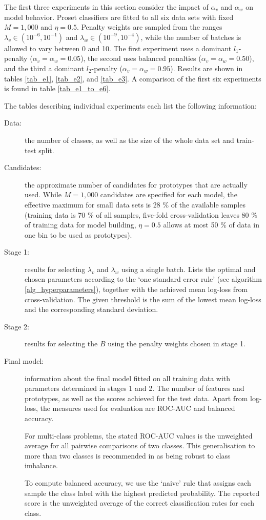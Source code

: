 %
The first three experiments in this section consider the impact of $\alpha_v$ and $\alpha_w$ on model behavior.
Proset classifiers are fitted to all six data sets with fixed $M=1,000$ and $\eta=0.5$.
Penalty weights are sampled from the ranges $\lambda_v\in(10^{-6},10^{-1})$ and $\lambda_w\in(10^{-9},10^{-4})$, while the number of batches is allowed to vary between 0 and 10.
The first experiment uses a dominant $l_1$-penalty ($\alpha_v=\alpha_w=0.05$), the second uses balanced penalties ($\alpha_v=\alpha_w=0.50$), and the third a dominant $l_2$-penalty ($\alpha_v=\alpha_w=0.95$).
Results are shown in tables \ref{tab_e1}, \ref{tab_e2}, and \ref{tab_e3}.
A comparison of the first six experiments is found in table \ref{tab_e1_to_e6}.\par
%
The tables describing individual experiments each list the following information:
%
\begin{description}
\item[Data:] the number of classes, as well as the size of the whole data set and train-test split.
%
\item[Candidates:] the approximate number of candidates for prototypes that are actually used.
While $M=1,000$ candidates are specified for each model, the effective maximum for small data sets is 28 \% of the available samples (training data is 70 \% of all samples, five-fold cross-validation leaves 80 \% of training data for model building, $\eta=0.5$ allows at most 50 \% of data in one bin to be used as prototypes).
%
\item[Stage 1:] results for selecting $\lambda_v$ and $\lambda_w$ using a single batch.
Lists the optimal and chosen parameters according to the `one standard error rule' (see algorithm \ref{alg_hyperparameters}), together with the achieved mean log-loss from cross-validation.
The given threshold is the sum of the lowest mean log-loss and the corresponding standard deviation.
%
\item[Stage 2:] results for selecting the $B$ using the penalty weights chosen in stage 1.
%
\item[Final model:] information about the final model fitted on all training data with parameters determined in stages 1 and 2.
The number of features and prototypes, as well as the scores achieved for the test data.
Apart from log-loss, the measures used for evaluation are ROC-AUC and balanced accuracy.\par
%
For multi-class problems, the stated ROC-AUC values is the unweighted average for all pairwise comparisons of two classes.
This generalisation to more than two classes is recommended in \cite{Hand_01} as being robust to class imbalance.\par
%
To compute balanced accuracy, we use the `naive' rule that assigns each sample the class label with the highest predicted probability.
The reported score is the unweighted average of the correct classification rates for each class.
\end{description}
